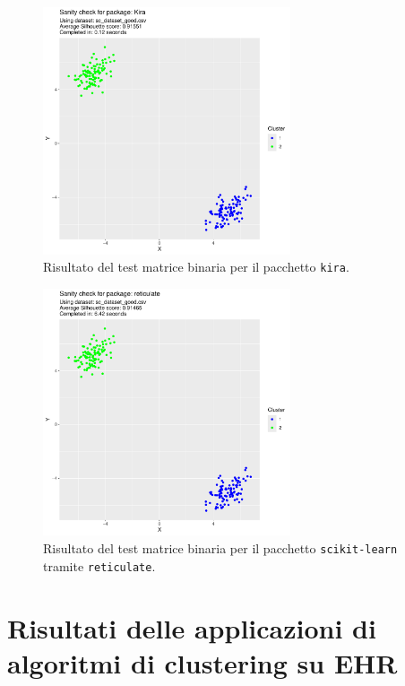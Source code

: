 \documentclass[a4paper, 12pt]{report}
\begin{document}
			\begin{figure}[H]
				\centering
				\includegraphics[width = 0.65\textwidth, page = 3]{results/results_KIRA.pdf}
				\caption{Risultato del test matrice binaria per il pacchetto \texttt{kira}.}
				\label{fig:kirabm}
			\end{figure}
			
			\begin{figure}[H]
				\centering
				\includegraphics[width = 0.65\textwidth, page = 3]{results/results_RETICULATE.pdf}
				\caption{Risultato del test matrice binaria per il pacchetto \texttt{scikit-learn} tramite \texttt{reticulate}.}
				\label{fig:reticulatebm}
			\end{figure}

		\section{Risultati delle applicazioni di algoritmi di clustering su EHR}
\end{document}
